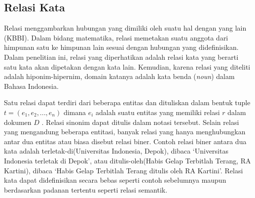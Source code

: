 \subsection{Relasi Kata}
Relasi menggambarkan hubungan yang dimiliki oleh suatu hal dengan yang lain (KBBI). Dalam bidang matematika, relasi memetakan suatu anggota dari himpunan satu ke himpunan lain sesuai dengan hubungan yang didefinisikan. Dalam penelitian ini, relasi yang diperhatikan adalah relasi kata yang berarti satu kata akan dipetakan dengan kata lain. Kemudian, karena relasi yang diteliti adalah hiponim-hipernim, domain katanya adalah kata benda (\textit{noun}) dalam Bahasa Indonesia.

Satu relasi dapat terdiri dari beberapa entitas dan dituliskan dalam bentuk tuple $t = (e_1, e_2, ..., e_n)$ dimana $e_i$ adalah suatu entitas yang memiliki relasi $r$ dalam dokumen $D$ \citep{bach2007review}. Relasi sinonim dapat ditulis dalam notasi tersebut. Selain relasi yang mengandung beberapa entitasi, banyak relasi yang hanya menghubungkan antar dua entitas atau biasa disebut relasi biner. Contoh relasi biner antara dua kata adalah terletak-di(Universitas Indonesia, Depok), dibaca `Universitas Indonesia terletak di Depok', atau ditulis-oleh(Habis Gelap Terbitlah Terang, RA Kartini), dibaca `Habis Gelap Terbitlah Terang ditulis oleh RA Kartini'. Relasi kata dapat didefinisikan secara bebas seperti contoh sebelumnya maupun berdasarkan padanan tertentu seperti relasi semantik.

